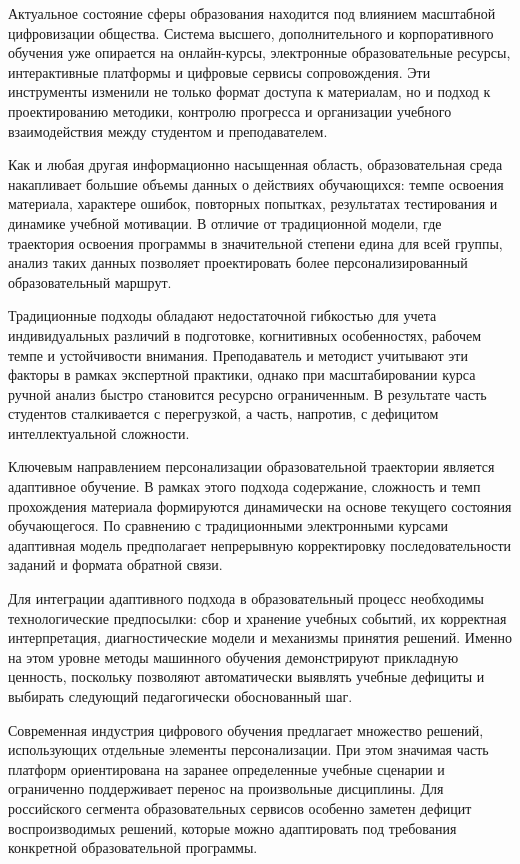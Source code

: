 Актуальное состояние сферы образования находится под влиянием масштабной
цифровизации общества. Система высшего, дополнительного и корпоративного
обучения уже опирается на онлайн-курсы, электронные образовательные ресурсы,
интерактивные платформы и цифровые сервисы сопровождения. Эти инструменты
изменили не только формат доступа к материалам, но и подход к проектированию
методики, контролю прогресса и организации учебного взаимодействия между
студентом и преподавателем.

Как и любая другая информационно насыщенная область, образовательная среда
накапливает большие объемы данных о действиях обучающихся: темпе освоения
материала, характере ошибок, повторных попытках, результатах тестирования и
динамике учебной мотивации. В отличие от традиционной модели, где траектория
освоения программы в значительной степени едина для всей группы, анализ таких
данных позволяет проектировать более персонализированный образовательный
маршрут.

Традиционные подходы обладают недостаточной гибкостью для учета индивидуальных
различий в подготовке, когнитивных особенностях, рабочем темпе и устойчивости
внимания. Преподаватель и методист учитывают эти факторы в рамках экспертной
практики, однако при масштабировании курса ручной анализ быстро становится
ресурсно ограниченным. В результате часть студентов сталкивается с перегрузкой,
а часть, напротив, с дефицитом интеллектуальной сложности.

Ключевым направлением персонализации образовательной траектории является
адаптивное обучение. В рамках этого подхода содержание, сложность и темп
прохождения материала формируются динамически на основе текущего состояния
обучающегося. По сравнению с традиционными электронными курсами адаптивная
модель предполагает непрерывную корректировку последовательности заданий и
формата обратной связи.

Для интеграции адаптивного подхода в образовательный процесс необходимы
технологические предпосылки: сбор и хранение учебных событий, их корректная
интерпретация, диагностические модели и механизмы принятия решений. Именно на
этом уровне методы машинного обучения демонстрируют прикладную ценность,
поскольку позволяют автоматически выявлять учебные дефициты и выбирать
следующий педагогически обоснованный шаг.

Современная индустрия цифрового обучения предлагает множество решений,
использующих отдельные элементы персонализации. При этом значимая часть
платформ ориентирована на заранее определенные учебные сценарии и ограниченно
поддерживает перенос на произвольные дисциплины. Для российского сегмента
образовательных сервисов особенно заметен дефицит воспроизводимых решений,
которые можно адаптировать под требования конкретной образовательной программы.


